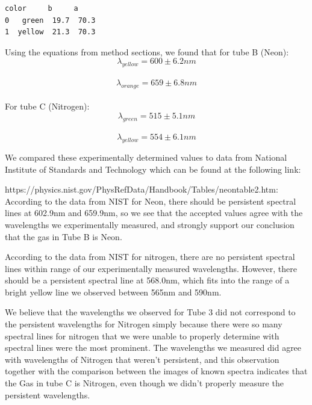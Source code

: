 \documentclass[11pt]{article}
\newcommand{\prompt}[4]{
        \llap{{\color{#2}[#3]: #4}}\vspace{-1.25em}
    }
\begin{document}
            \begin{tcolorbox}[breakable, boxrule=.5pt, size=fbox, pad at break*=1mm, opacityfill=0]
\prompt{Out}{outcolor}{12}{\hspace{3.5pt}}
\begin{Verbatim}[commandchars=\\\{\}]
    color     b     a
0   green  19.7  70.3
1  yellow  21.3  70.3
\end{Verbatim}
\end{tcolorbox}
        
    Using the equations from method sections, we found that for tube B
(Neon):\\
\[\lambda_{yellow} = 600\pm6.2nm\]\\
\[\lambda_{orange} = 659\pm6.8nm\]\\
For tube C (Nitrogen):\\
\[\lambda_{green} = 515\pm5.1nm\]\\
\[\lambda_{yellow} = 554\pm6.1nm\]

We compared these experimentally determined values to data from National
Institute of Standards and Technology which can be found at the following link:

https://physics.nist.gov/PhysRefData/Handbook/Tables/neontable2.htm: \\


According to the data from NIST for Neon, there should be persistent
spectral lines at 602.9nm and 659.9nm, so we see that the accepted
values agree with the wavelengths we experimentally measured, and
strongly support our conclusion that the gas in Tube B is Neon.

According to the data from NIST for nitrogen, there are no persistent
spectral lines within range of our experimentally measured wavelengths.
However, there should be a persistent spectral line at 568.0nm, which
fits into the range of a bright yellow line we observed between 565nm
and 590nm.

We believe that the wavelengths we observed for Tube 3 did not
correspond to the persistent wavelengths for Nitrogen simply because
there were so many spectral lines for nitrogen that we were unable to
properly determine with spectral lines were the most prominent. The
wavelengths we measured did agree with wavelengths of Nitrogen that
weren't persistent, and this observation together with the comparison
between the images of known spectra indicates that the Gas in tube C is
Nitrogen, even though we didn't properly measure the persistent
wavelengths.
\end{document}
